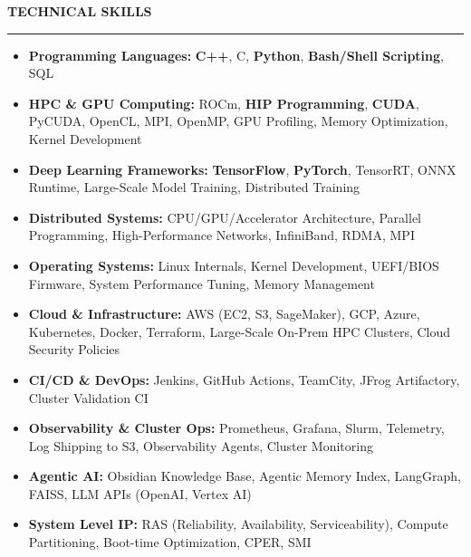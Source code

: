 \documentclass{resume} %
\renewenvironment{rSection}[1]{ %
  \sectionskip
  \textcolor{primaryColor}{\MakeUppercase{\bf #1}} %
  \sectionlineskip
  {\color{primaryColor}\hrule} %
  \begin{list}{}{ %
    \setlength{\leftmargin}{1.5em} %
  }
  \item[]
}{
  \end{list}
}
\begin{document}
\begin{rSection}{TECHNICAL SKILLS}

\if{}
\begin{itemize}
    \item \textbf{\textcolor{primaryColor}{Programming Languages:}} \textbf{C++}, C, \textbf{Python}, \textbf{Bash/Shell Scripting}, SQL
    \item \textbf{\textcolor{primaryColor}{HPC \& GPU Computing:}} ROCm, \textbf{HIP Programming}, \textbf{CUDA}, PyCUDA, OpenCL, MPI, OpenMP, GPU Profiling, Memory Optimization, Kernel Development
    \item \textbf{\textcolor{primaryColor}{Deep Learning Frameworks:}} \textbf{TensorFlow}, \textbf{PyTorch}, TensorRT, ONNX Runtime, Large-Scale Model Training, Distributed Training
    \item \textbf{\textcolor{primaryColor}{Distributed Systems:}} CPU/GPU/Accelerator Architecture, Parallel Programming, High-Performance Networks, InfiniBand, RDMA, MPI
    \item \textbf{\textcolor{primaryColor}{Operating Systems:}} Linux Internals, Kernel Development, UEFI/BIOS Firmware, System Performance Tuning, Memory Management
    \item \textbf{\textcolor{primaryColor}{Cloud \& Infrastructure:}} AWS (EC2, S3, SageMaker), GCP, Azure, Kubernetes, Docker, Terraform, Large-Scale On-Prem HPC Clusters, Cloud Security Policies
    \item \textbf{\textcolor{primaryColor}{CI/CD \& DevOps:}} Jenkins, GitHub Actions, TeamCity, JFrog Artifactory, Cluster Validation CI
    \item \textbf{\textcolor{primaryColor}{Observability \& Cluster Ops:}} Prometheus, Grafana, Slurm, Telemetry, Log Shipping to S3, Observability Agents, Cluster Monitoring
    \item \textbf{\textcolor{primaryColor}{Agentic AI:}} Obsidian Knowledge Base, Agentic Memory Index, LangGraph, FAISS, LLM APIs (OpenAI, Vertex AI)
    \item \textbf{\textcolor{primaryColor}{System Level IP:}} RAS (Reliability, Availability, Serviceability), Compute Partitioning, Boot-time Optimization, CPER, SMI
\end{itemize}
\fi


\end{rSection}
\end{document}
